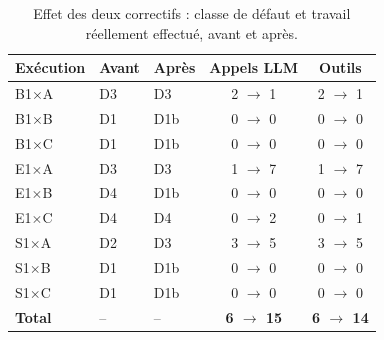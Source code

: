 \begin{table}[htbp]
\centering
\caption{Effet des deux correctifs : classe de défaut et travail réellement effectué, avant et après.}
\label{tab:avantapres}
\begin{tabular}{lllcc}
\toprule
Exécution & Avant & Après & Appels LLM & Outils \\
\midrule
B1$\times$A & D3 & D3 & 2 $\to$ 1 & 2 $\to$ 1 \\
B1$\times$B & D1 & D1b & 0 $\to$ 0 & 0 $\to$ 0 \\
B1$\times$C & D1 & D1b & 0 $\to$ 0 & 0 $\to$ 0 \\
E1$\times$A & D3 & D3 & 1 $\to$ 7 & 1 $\to$ 7 \\
E1$\times$B & D4 & D1b & 0 $\to$ 0 & 0 $\to$ 0 \\
E1$\times$C & D4 & D4 & 0 $\to$ 2 & 0 $\to$ 1 \\
S1$\times$A & D2 & D3 & 3 $\to$ 5 & 3 $\to$ 5 \\
S1$\times$B & D1 & D1b & 0 $\to$ 0 & 0 $\to$ 0 \\
S1$\times$C & D1 & D1b & 0 $\to$ 0 & 0 $\to$ 0 \\
\midrule
\textbf{Total} & -- & -- & \textbf{6 $\to$ 15} & \textbf{6 $\to$ 14} \\
\bottomrule
\end{tabular}
\end{table}

